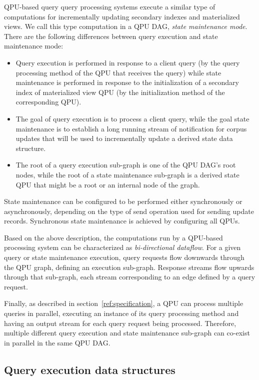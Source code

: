 \medskip
QPU-based query query processing systems execute a similar type of computations for incrementally updating
secondary indexes and materialized views.
We call this type computation in a QPU DAG, \textit{state maintenance mode}.
There are the following differences between query execution and state maintenance mode:
\begin{itemize}
  \item Query execution is performed in response to a client query (by the query processing method of the QPU that receives the query)
  while state maintenance is performed in response to the initialization of a secondary index of materialized view QPU
  (by the initialization method of the corresponding QPU).
  \item The goal of query execution is to process a client query,
  while the goal state maintenance is to establish a long running stream of notification for corpus updates that
  will be used to incrementally update a derived state data structure.
  \item The root of a query execution sub-graph is one of the QPU DAG's root nodes,
  while the root of a state maintenance sub-graph is a derived state QPU that might be a root or an internal node of the
  graph.
\end{itemize}

\medskip
\noindent
State maintenance can be configured to be performed either synchronously or asynchronously, depending on the type of send
operation used for sending update records.
Synchronous state maintenance is achieved by configuring all QPUs.

\medskip
\noindent
Based on the above description, the computations run by a QPU-based processing system can be characterized as
\textit{bi-directional dataflow}.
For a given query or state maintenance execution,
query requests flow downwards through the QPU graph, defining an execution sub-graph.
Response streams flow upwards through that sub-graph, each stream corresponding to an edge defined by a query request.

\medskip
\noindent
Finally, as described in section~\ref{ref:specification}, a QPU can process multiple queries in parallel,
executing an instance of its query processing method and having an output stream for each query request being processed.
Therefore, multiple different query execution and state maintenance sub-graph can co-exist in parallel in the same QPU DAG.


\subsection{Query execution data structures}

